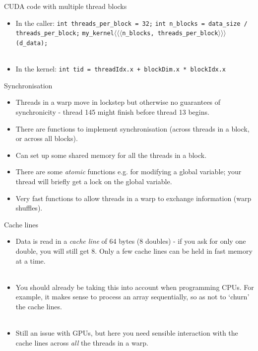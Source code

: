 \documentclass[usenames,dvipsnames]{beamer}
\begin{document}
\begin{frame}{CUDA code with multiple thread blocks}
  \begin{block}{}
    \begin{itemize}
      \item{In the caller:\newline
      \texttt{int threads\_per\_block = 32;}\newline
      \texttt{int n\_blocks = data\_size / threads\_per\_block;}\newline
      \texttt{my\_kernel}$\langle\langle\langle$\texttt{n\_blocks, threads\_per\_block}$\rangle\rangle\rangle$\texttt{(d\_data);}
      }\\~\
      \item{In the kernel:\newline
      \texttt{int tid = threadIdx.x + blockDim.x * blockIdx.x}
      }
    \end{itemize}
  \end{block}
\end{frame}

\begin{frame}{Synchronisation}
  \begin{block}{}
    \begin{itemize}
      \item{Threads in a warp move in lockstep but otherwise no guarantees of synchronicity - thread 145 might finish before thread 13 begins.}
      \item{There are functions to implement synchronisation (across threads in a block, or across all blocks).}
      \item{Can set up some shared memory for all the threads in a block.}
      \item{There are some \textit{atomic} functions e.g. for modifying a global variable; your thread will briefly get a lock on the global variable.}
      \item{Very fast functions to allow threads in a warp to exchange information (warp shuffles).}
    \end{itemize}
  \end{block}
\end{frame}

\begin{frame}{Cache lines}
  \begin{block}{}
    \begin{itemize}
      \item{Data is read in a \textit{cache line} of 64 bytes (8 doubles) - if you ask for only one double, you will still get 8. Only a few cache lines can be held in fast memory at a time.}\\~\
      \item{You should already be taking this into account when programming CPUs. For example, it makes sense to process an array sequentially, so as not to `churn' the cache lines.}\\~\
      \item{Still an issue with GPUs, but here you need sensible interaction with the cache lines across \textit{all} the threads in a warp.}
    \end{itemize}
  \end{block}
\end{frame}
\end{document}
